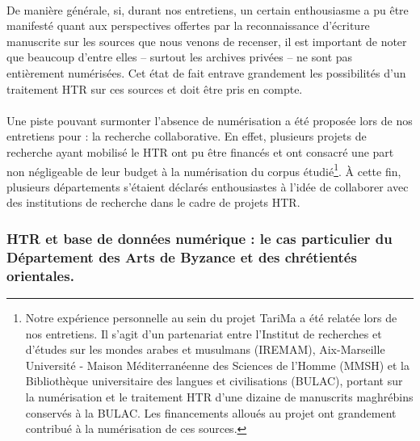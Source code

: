 \documentclass[a4paper,12pt,twoside]{book}
\begin{document}
\paragraph{}
De manière générale, si, durant nos entretiens, un certain enthousiasme a pu être manifesté quant aux perspectives offertes par la reconnaissance d'écriture manuscrite sur les sources que nous venons de recenser, il est important de noter que beaucoup d'entre elles – surtout les archives privées – ne sont pas entièrement numérisées. Cet état de fait entrave grandement les possibilités d'un traitement HTR sur ces sources et doit être pris en compte. 

\paragraph{}
Une piste pouvant surmonter l'absence de numérisation a été proposée lors de nos entretiens pour  : la recherche collaborative. En effet, plusieurs projets de recherche ayant mobilisé le HTR ont pu être financés et ont consacré une part non négligeable de leur budget à la numérisation du corpus étudié\footnote{Notre expérience personnelle au sein du projet TariMa a été relatée lors de nos entretiens. Il s'agit d'un partenariat entre l'Institut de recherches et d'études sur les mondes arabes et musulmans (IREMAM), Aix-Marseille Université - Maison Méditerranéenne des Sciences de l'Homme (MMSH) et la Bibliothèque universitaire des langues et civilisations (BULAC), portant sur la numérisation et le traitement HTR d'une dizaine de manuscrits maghrébins conservés à la BULAC. Les financements alloués au projet ont grandement contribué à la numérisation de ces sources.}. À cette fin, plusieurs départements s'étaient déclarés enthousiastes à l'idée de collaborer avec des institutions de recherche dans le cadre de projets HTR.




\subsubsection{HTR et base de données numérique : le cas particulier du Département des Arts de Byzance et des chrétientés orientales.}
\end{document}
